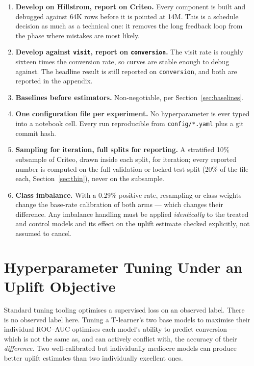 \documentclass[11pt,a4paper]{article}
\begin{document}
\begin{enumerate}
\item \textbf{Develop on Hillstrom, report on Criteo.} Every component is built and debugged
against 64K rows before it is pointed at 14M. This is a schedule decision as much as a technical
one: it removes the long feedback loop from the phase where mistakes are most likely.
\item \textbf{Develop against \texttt{visit}, report on \texttt{conversion}.} The visit rate is
roughly sixteen times the conversion rate, so curves are stable enough to debug against. The
headline result is still reported on \texttt{conversion}, and both are reported in the appendix.
\item \textbf{Baselines before estimators.} Non-negotiable, per Section~\ref{sec:baselines}.
\item \textbf{One configuration file per experiment.} No hyperparameter is ever typed into a
notebook cell. Every run reproducible from \texttt{config/*.yaml} plus a git commit hash.
\item \textbf{Sampling for iteration, full splits for reporting.} A stratified 10\% subsample of
Criteo, drawn inside each split, for iteration; every reported number is computed on the full
validation or locked test split (20\% of the file each, Section~\ref{sec:thin}), never on the
subsample.
\item \textbf{Class imbalance.} With a 0.29\% positive rate, resampling or class weights change the
base-rate calibration of both arms --- which changes their difference. Any imbalance handling must
be applied \emph{identically} to the treated and control models and its effect on the uplift
estimate checked explicitly, not assumed to cancel.
\end{enumerate}

\section{Hyperparameter Tuning Under an Uplift Objective}

\begin{alertbox}
Standard tuning tooling optimises a supervised loss on an observed label. There is no observed
label here. Tuning a T-learner's two base models to maximise their individual ROC--AUC optimises
each model's ability to predict conversion --- which is not the same as, and can actively conflict
with, the accuracy of their \emph{difference}. Two well-calibrated but individually mediocre models
can produce better uplift estimates than two individually excellent ones.
\end{alertbox}
\end{document}
